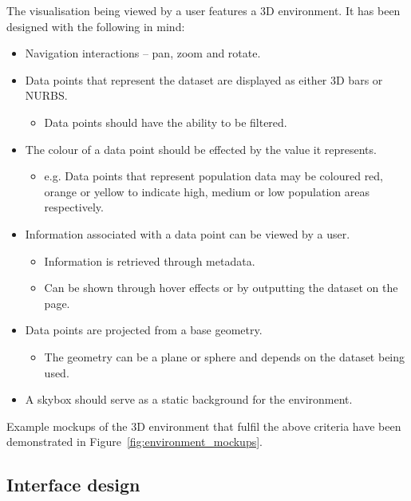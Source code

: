 {{		The visualisation being viewed by a user features a 3D environment. It has been designed with the following in mind:

		\begin{itemize}
			\item Navigation interactions -- pan, zoom and rotate.
			\item Data points that represent the dataset are displayed as either 3D bars or NURBS.
				\begin{itemize}
					\item Data points should have the ability to be filtered.
				\end{itemize}
			\item The colour of a data point should be effected by the value it represents.
				\begin{itemize}
					\item e.g. Data points that represent population data may be coloured red, orange or yellow to indicate high, medium or low population areas respectively.
				\end{itemize}
			\item Information associated with a data point can be viewed by a user.
				\begin{itemize}
					\item Information is retrieved through metadata. 
					\item Can be shown through hover effects or by outputting the dataset on the page.
				\end{itemize}
			\item Data points are projected from a base geometry.
				\begin{itemize}
					\item The geometry can be a plane or sphere and depends on the dataset being used.
				\end{itemize}
			\item A skybox should serve as a static background for the environment.
		\end{itemize}

		Example mockups of the 3D environment that fulfil the above criteria have been demonstrated in Figure~\ref{fig:environment_mockups}.

		

	}

	\subsection{Interface design} {
	\label{sec:interface_design}

}}
